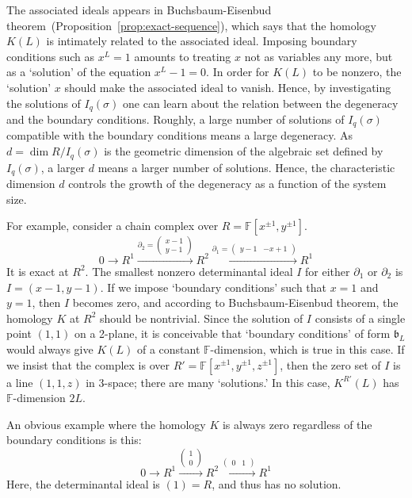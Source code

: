 \documentclass[letterpaper,12pt]{amsart}
\theoremstyle{definition} \newtheorem{defn}{Definition}
\theoremstyle{definition} \newtheorem{rem}{Remark}
\theoremstyle{definition} \newtheorem{example}{Example}
\newcommand{\FF}{\mathbb{F}}
\newcommand{\bb}{\mathfrak{b}}
\begin{document}
The associated ideals appears in Buchsbaum-Eisenbud theorem~(Proposition~\ref{prop:exact-sequence}),
which says that the homology $K(L)$ is intimately related to the associated ideal.
Imposing boundary conditions such as $x^L=1$
amounts to treating $x$ not as variables any more,
but as a `solution' of the equation $x^L-1=0$.
In order for $K(L)$ to be nonzero,
the `solution' $x$ should make the associated ideal to vanish.
Hence, by investigating the solutions of $I_q(\sigma)$
one can learn about the relation between the degeneracy and the boundary conditions.
Roughly, a large number of solutions of $I_q(\sigma)$ 
compatible with the boundary conditions
means a large degeneracy.
As $d = \dim R/I_q(\sigma)$ is the geometric dimension of the algebraic set defined by $I_q(\sigma)$,
a larger $d$ means a larger number of solutions.
Hence, the characteristic dimension $d$
controls the growth of the degeneracy as a function of the system size.

For example, consider a chain complex over $R = \FF[x^{\pm 1},y^{\pm 1}]$.
\[
0 \to
 R^1 
\xrightarrow{ \partial_2 = \begin{pmatrix} x-1 \\ y-1 \end{pmatrix} } 
 R^2
\xrightarrow{ \partial_1 = \begin{pmatrix} y-1 & -x +1 \end{pmatrix} }
 R^1
\]
It is exact at $R^2$.
The smallest nonzero determinantal ideal $I$ for either $\partial_1$ or $\partial_2$ is $I=(x-1,y-1)$.
If we impose `boundary conditions' such that $x=1$ and $y=1$,
then $I$ becomes zero, and according to Buchsbaum-Eisenbud theorem,
the homology $K$ at $R^2$ should be nontrivial.
Since the solution of $I$ consists of a single point $(1,1)$ on a 2-plane,
it is conceivable that `boundary conditions' of form $\bb_L$
would always give $K(L)$ of a constant $\FF$-dimension,
which is true in this case.
%
If we insist that the complex is over $R' = \FF[x^{\pm 1},y^{\pm 1},z^{\pm 1}]$,
then the zero set of $I$ is a line $(1,1,z)$ in 3-space;
there are many `solutions.'
In this case, $K^{R'}(L)$ has $\FF$-dimension $2L$.

An obvious example where the homology $K$ is always zero regardless of the boundary conditions
is this:
\[
0 \to
 R^1 
\xrightarrow{ \begin{pmatrix} 1 \\ 0 \end{pmatrix} } 
 R^2
\xrightarrow{ \begin{pmatrix} 0 & 1 \end{pmatrix} }
 R^1
\]
Here, the determinantal ideal is $(1)=R$, and thus has no solution.
\end{document}
